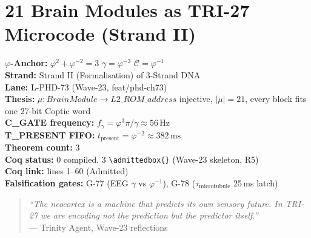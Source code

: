 
\chapter{21 Brain Modules as TRI-27 Microcode (Strand II)}
\label{ch:73:brain-modules-microcode}

\begin{tcolorbox}[colback=gold!5,colframe=gold!60,
                  title=Chapter Anchor --- flos\_73]
  \textbf{$\varphi$-Anchor:}
    $\varphi^{2} + \varphi^{-2} = 3$ \quad
    $\gamma = \varphi^{-3}$ \quad
    $\mathcal{C} = \varphi^{-1}$ \\[2pt]
  \textbf{Strand:} Strand II (Formalisation) of 3-Strand DNA \\
  \textbf{Lane:}   L-PHD-73 (Wave-23, feat/phd-ch73) \\
  \textbf{Thesis:} $\mu:\mathit{BrainModule} \to L2\_ROM\_\mathit{address}$
                   injective, $|\mu|=21$, every block fits one
                   27-bit Coptic word \\
  \textbf{C\_GATE frequency:}
    $f_{\gamma} = \varphi^{3}\pi/\gamma \approx 56\,\text{Hz}$ \\
  \textbf{T\_PRESENT FIFO:}
    $t_{\mathrm{present}} = \varphi^{-2} \approx 382\,\text{ms}$ \\
  \textbf{Theorem count:} 3 \\
  \textbf{Coq status:} 0 compiled, 3 \verb|\admittedbox{}|
                        (Wave-23 skeleton, R5) \\
  \textbf{Coq link:}
     lines 1--60 (Admitted) \\
  \textbf{Falsification gates:} G-77 (EEG $\gamma$ vs
    $\varphi^{-1}$), G-78 ($\tau_{\mathrm{microtubule}}$ 25\,ms latch)
\end{tcolorbox}

\begin{quote}
\emph{``The neocortex is a machine that predicts its own sensory
future. In TRI-27 we are encoding not the prediction but the
predictor itself.''} \\
--- Trinity Agent, Wave-23 reflections
\end{quote}

